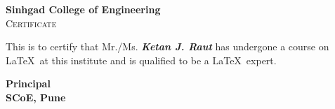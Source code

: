 \documentclass[12pt]{article}
\begin{document}
\begin{center}
	\textbf {\huge Sinhgad College of Engineering}\\[1cm]
	\textsc {\LARGE  Certificate}
\end{center}

\noindent This  is  to  certify  that  Mr./Ms. \textbf {\textit {Ketan J. Raut}} has  undergone  a course  on \\
\LaTeX\ at  this  institute  and  is  qualified  to  be  a  \LaTeX\ expert.\\[1cm]

\begin{flushright}
	\textsf {\textbf {Principal\\
	SCoE, Pune}}
\end{flushright}
\end{document}
